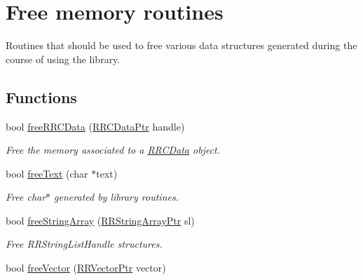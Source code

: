 \hypertarget{group__free_routines}{\section{Free memory routines}
\label{group__free_routines}
}


Routines that should be used to free various data structures generated during the course of using the library.  


\subsection*{Functions}
\begin{DoxyCompactItemize}
\item 
\hypertarget{group__free_routines_ga96317bb0c9ad3daee01c9665cc14b223}{bool \hyperlink{group__free_routines_ga96317bb0c9ad3daee01c9665cc14b223}{free\+R\+R\+C\+Data} (\hyperlink{rrc__types_8h_a9da8b124eb9c3c0045f8926c6a420b4a}{R\+R\+C\+Data\+Ptr} handle)}\label{group__free_routines_ga96317bb0c9ad3daee01c9665cc14b223}

\begin{DoxyCompactList}\small\item\em Free the memory associated to a \hyperlink{struct_r_r_c_data}{R\+R\+C\+Data} object. \end{DoxyCompactList}\item 
\hypertarget{group__free_routines_gab2e32a8a1058720ae1912a67f5bdc269}{bool \hyperlink{group__free_routines_gab2e32a8a1058720ae1912a67f5bdc269}{free\+Text} (char $\ast$text)}\label{group__free_routines_gab2e32a8a1058720ae1912a67f5bdc269}

\begin{DoxyCompactList}\small\item\em Free char$\ast$ generated by library routines. \end{DoxyCompactList}\item 
bool \hyperlink{group__free_routines_ga1063c18523547aa3339347d9fc8cd6e0}{free\+String\+Array} (\hyperlink{rrc__types_8h_a7c9475df6c7337d99482b13a365e7596}{R\+R\+String\+Array\+Ptr} sl)
\begin{DoxyCompactList}\small\item\em Free R\+R\+String\+List\+Handle structures. \end{DoxyCompactList}\item 
\hypertarget{group__free_routines_ga8a8e57e9c2ec5d906c931d7a90b4ce18}{bool \hyperlink{group__free_routines_ga8a8e57e9c2ec5d906c931d7a90b4ce18}{free\+Vector} (\hyperlink{rrc__types_8h_a3be72d6006034fd349f753d2bf441bf7}{R\+R\+Vector\+Ptr} vector)}\label{group__free_routines_ga8a8e57e9c2ec5d906c931d7a90b4ce18}


\end{DoxyCompactItemize}
